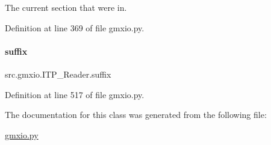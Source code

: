 The current section that we\textquotesingle{}re in. 



Definition at line 369 of file gmxio.\+py.

\mbox{\label{classsrc_1_1gmxio_1_1ITP__Reader_af4b9cf536091bc0a1d784f8e17905838}} 
\paragraph{\texorpdfstring{suffix}{suffix}}
{\footnotesize\ttfamily src.\+gmxio.\+I\+T\+P\+\_\+\+Reader.\+suffix}



Definition at line 517 of file gmxio.\+py.



The documentation for this class was generated from the following file\+:\begin{DoxyCompactItemize}
\item 
\hyperlink{gmxio_8py}{gmxio.\+py}\end{DoxyCompactItemize}
